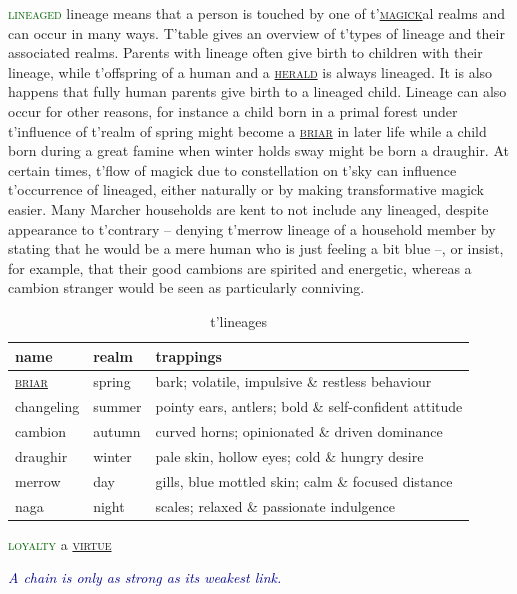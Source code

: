 \documentclass[twoside,11pt,b5paper,twocolumn]{scrbook}
\newcommand{\estcab}[1]{\textsc{\textcolor{marron}{#1}}}
\renewcommand{\paragraph}[1]{\par\noindent\markboth{#1}{#1}\estcab{\textcolor{darkgreen}{#1}}\label{#1} }
\newcommand{\see}[1]{{\estcab{\hyperref[#1]{#1}}}}
\newcommand{\proverb}[1]{\par \textcolor{darkblue}{\itshape #1}}
\begin{document}
\paragraph{lineaged} lineage means that a person is touched by one of t'\see{magick}al realms and can occur in many ways. T'table gives an overview of t'types of lineage and their associated realms. Parents with lineage often give birth to children with their lineage, while t'offspring of a human and a \see{herald} is always lineaged. It is also happens that fully human parents give birth to a lineaged child. Lineage can also occur for other reasons, for instance a child born in a primal forest under t'influence of t'realm of spring might become a \see{briar} in later life while a child born during a great famine when winter holds sway might be born a draughir. At certain times, t'flow of magick due to constellation on t'sky can influence t'occurrence of lineaged, either naturally or by making transformative magick easier. Many Marcher households are kent to not include any lineaged, despite appearance to t'contrary – denying t'merrow lineage of a household member by stating that he would be a mere human who is just feeling a bit blue –, or insist, for example, that their good cambions are spirited and energetic, whereas a cambion stranger would be seen as particularly conniving.\begin{table}\begin{tabular}{lll} name& realm& trappings\\ \hline \see{briar}& spring& bark; volatile, impulsive \& restless behaviour\\ changeling& summer& pointy ears, antlers; bold \& self-confident attitude\\ cambion& autumn& curved horns; opinionated \& driven dominance\\ draughir& winter& pale skin, hollow eyes; cold \& hungry desire\\ merrow& day& gills, blue mottled skin; calm \& focused distance\\ naga& night& scales; relaxed \& passionate indulgence\end{tabular}\caption{t'lineages}\end{table}
\paragraph{loyalty} a \see{virtue} \proverb{A chain is only as strong as its weakest link.}
\end{document}
